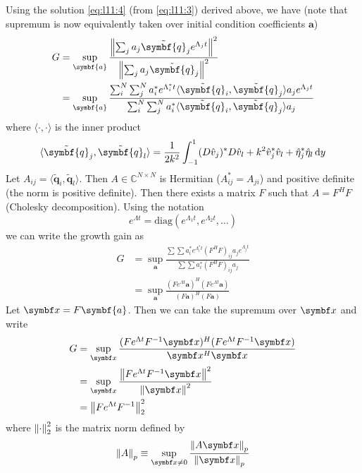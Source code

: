 \documentclass{jknotes}
\begin{document}
Using the solution \eqref{eq:l11:4} (from \eqref{eq:l11:3}) derived above, we
have (note that supremum is now equivalently taken over initial condition
coefficients $\symbf{a}$)
\begin{align}
	G &= \sup_{\symbf{a}} \frac{ \norm{ \sum_j a_j \tilde{\symbf{q}}_j
	e^{\Lambda_j t}}^2 }{ \norm{ \sum_j a_j \tilde{\symbf{q}}_j}^2 } \\
	  &= \sup_{\symbf{a}} \frac{ \sum_i^N \sum_j^N a_i^* e^{\Lambda_i^* t}
		  \langle \tilde{\symbf{q}}_i, \tilde{\symbf{q}}_j \rangle a_j
	  e^{\Lambda_j t}}{ \sum_i^N \sum_j^N a_i^*
  \langle \tilde{\symbf{q}}_i, \tilde{\symbf{q}}_j \rangle a_j} \\
\end{align}
where $\langle\cdot,\cdot\rangle$ is the inner product
\begin{equation}
	\langle \tilde{\symbf{q}}_j, \tilde{\symbf{q}}_l\rangle = \frac{1}{2k^2}
	\int_{-1}^1 (D \hat{v}_j)^* D\hat{v}_l + k^2 \hat{v}_j^* \hat{v}_l +
	\hat{\eta}_j^* \hat{\eta}_l \, \diffd y
\end{equation}
Let $A_{ij} = \langle \tilde{\symbf{q}}_i, \tilde{\symbf{q}}_l\rangle$. Then
$A \in \mathbb{C}^{N \times N}$ is Hermitian ($A_{ij}^* = A_{ji}$) and
positive definite (the norm is positive definite). Then there exists a matrix
$F$ such that $A = F^H F$ (Cholesky decomposition). Using the notation
\begin{equation}
	e^{\Lambda t} = \text{diag}(e^{\Lambda_1 t}, e^{\Lambda_2 t}, \dots )
\end{equation}
we can write the growth gain as
\begin{align}
	G &= \sup_{\symbf{a}} \frac{\sum \sum a_i^* e^{\Lambda_i^* t} (F^H F)_{ij}
	a_j e^{\Lambda_j t}}{\sum \sum a_i^* (F^H F)_{ij} a_j} \\
	  &= \sup_{\symbf{a}} \frac{(F e^{\Lambda t} \symbf{a})^H (Fe^{\Lambda
	  t}\symbf{a})}{(F\symbf{a})^H(F\symbf{a})}
\end{align}
Let $\x = F\symbf{a}$. Then we can take the supremum over $\x$ and write
\begin{align}
	G &= \sup_{\x} \frac{(Fe^{\Lambda t} F^{-1}\x)^H(Fe^{\Lambda
	t}F^{-1}\x)}{\x^H \x} \\
	  &= \sup_{\x} \frac{\norm{Fe^{\Lambda t}F^{-1}\x}^2}{\norm{\x}^2} \\
	  &= \norm{Fe^{\Lambda t}F^{-1}}^2_2
\end{align}
where $\norm{\cdot}^2_2$ is the matrix norm defined by
\begin{equation}
	\norm{A}_p \equiv \sup_{\x \ne 0} \frac{\norm{A \x}_p}{\norm{\x}_p}
\end{equation}
\end{document}
